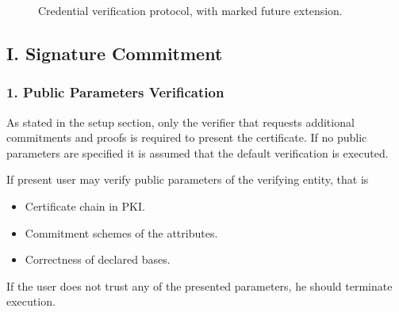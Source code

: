 \begin{figure}[h]
\centering
{}
\caption{Credential verification protocol, with marked future extension.}
\label{tech:verify-protocol}
\end{figure}

\subsection*{I. Signature Commitment}
\subsubsection*{1. Public Parameters Verification}
As stated in the setup section, only the verifier that requests additional commitments and proofs is required to present the certificate. If no public parameters are specified it is assumed that the default verification is executed.

If present user may verify public parameters of the verifying entity, that is
\begin{itemize}[label=$\circ$]
    \item Certificate chain in PKI.
    \item Commitment schemes of the attributes.
    \item Correctness of declared bases.
\end{itemize}
If the user does not trust any of the presented parameters, he should terminate execution.

